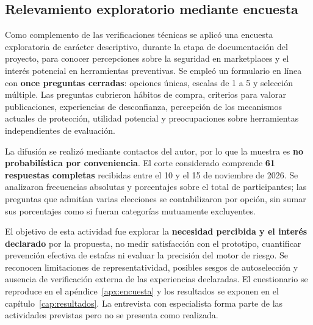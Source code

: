 \subsection{Relevamiento exploratorio mediante encuesta}
\label{subsec:ml-encuesta-metodo}

Como complemento de las verificaciones técnicas se aplicó una encuesta exploratoria de carácter descriptivo, durante la etapa de documentación del proyecto, para conocer percepciones sobre la seguridad en marketplaces y el interés potencial en herramientas preventivas. Se empleó un formulario en línea con \textbf{once preguntas cerradas}: opciones únicas, escalas de 1 a 5 y selección múltiple. Las preguntas cubrieron hábitos de compra, criterios para valorar publicaciones, experiencias de desconfianza, percepción de los mecanismos actuales de protección, utilidad potencial y preocupaciones sobre herramientas independientes de evaluación.

La difusión se realizó mediante contactos del autor, por lo que la muestra es \textbf{no probabilística por conveniencia}. El corte considerado comprende \textbf{61 respuestas completas} recibidas entre el 10 y el 15 de noviembre de 2026. Se analizaron frecuencias absolutas y porcentajes sobre el total de participantes; las preguntas que admitían varias elecciones se contabilizaron por opción, sin sumar sus porcentajes como si fueran categorías mutuamente excluyentes.

El objetivo de esta actividad fue explorar la \textbf{necesidad percibida y el interés declarado} por la propuesta, no medir satisfacción con el prototipo, cuantificar prevención efectiva de estafas ni evaluar la precisión del motor de riesgo. Se reconocen limitaciones de representatividad, posibles sesgos de autoselección y ausencia de verificación externa de las experiencias declaradas. El cuestionario se reproduce en el apéndice~\ref{apx:encuesta} y los resultados se exponen en el capítulo~\ref{cap:resultados}. La entrevista con especialista forma parte de las actividades previstas pero no se presenta como realizada.

